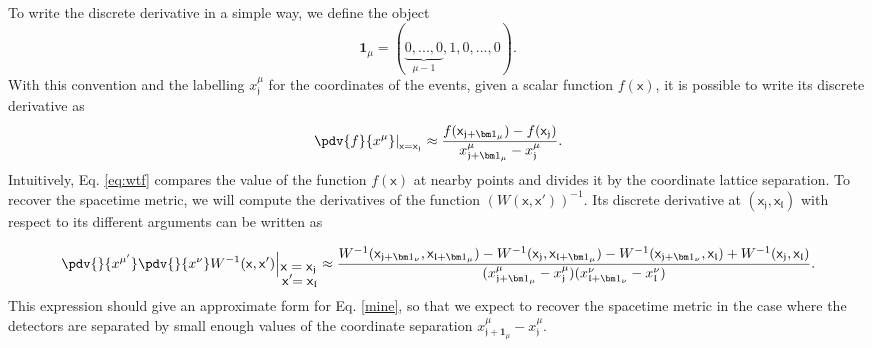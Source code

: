 \documentclass[letterpaper,12pt,titlepage,oneside,final]{book}
\newcommand{\mf}{\mathsf}%
\begin{document}
    To write the discrete derivative in a simple way, we define the object
    \begin{equation}
        \bm 1_\mu = (\underbrace{0,...,0}_{{\mu-1}},1,0,...,0).
    \end{equation}
    With this convention and the labelling $x_{\mathfrak{j}}^\mu$ for the coordinates of the events, given a scalar function $f(\mf x)$, it is possible to write its discrete derivative as
    \begin{equation}\label{eq:wtf}
        \left. \pdv{f}{x^\mu} \right|_{\mf x =\mf x_{\mathfrak{j}}}  \approx \frac{f(\mf x_{\mathfrak{j}+\bm 1_\mu})-f(\mf x_{\mathfrak{j}})}{x^\mu_{\mathfrak{j}+\bm 1_\mu}-x^\mu_{\mathfrak{j}}}.
    \end{equation}
    Intuitively, Eq. \eqref{eq:wtf} compares the value of the function $f(\mf x)$ at nearby points and divides it by the coordinate lattice separation. To recover the spacetime metric, we will compute the derivatives of the function $(W(\mf x,\mf x'))^{-1}$. Its discrete derivative at $(\mf x_{\mathfrak{j}},\mf x_{\mathfrak{l}})$ with respect to its different arguments can be written as

    {\footnotesize
        \begin{equation}\label{eq:Wapprox}
            \left.\pdv{}{x^{\mu'}}\pdv{}{x^{\nu}}W^{-1}(\mf x,\mf x')\right|_{\overset{\displaystyle{\mf x = \mf x_{\mathfrak{j}}}}{\displaystyle{\,\mf x'\!\!=\mf x_{\mathfrak{l}}}}}\approx\frac{ W^{-1}(\mf x_{\mathfrak{j}+\bm 1_\nu},\mf x_{\mathfrak{l}+\bm 1_\mu})-W^{-1}(\mf x_{\mathfrak{j}},\mf x_{\mathfrak{l}+\bm 1_\mu})-W^{-1}(\mf x_{\mathfrak{j}+\bm 1_\nu},\mf x_{\mathfrak{l}})+W^{-1}(\mf x_{\mathfrak{j}},\mf x_{\mathfrak{l}})}{(x^\mu_{\mathfrak{j}+\bm 1_\mu}-x^\mu_{\mathfrak{j}})(x^\nu_{\mathfrak{l}+\bm 1_\nu}-x^\nu_{\mathfrak{l}})}.
        \end{equation}}
    This expression should give an approximate form for Eq. \eqref{mine}, so that we expect to recover the spacetime metric in the case where the detectors are separated by small enough values of {the coordinate separation} $x^\mu_{\mathfrak{j}+\bm 1_\mu}-x^\mu_{\mathfrak{j}}$.
    
\end{document}

